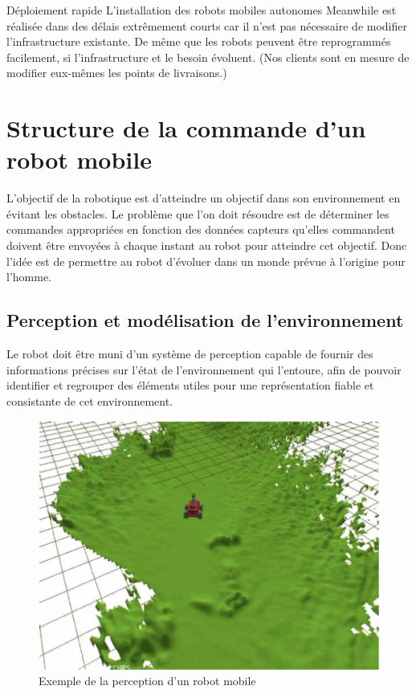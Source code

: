 Déploiement rapide 
L’installation des robots mobiles autonomes Meanwhile est réalisée dans des délais extrêmement courts car il n’est pas nécessaire de modifier l’infrastructure existante. De même que les robots peuvent être reprogrammés facilement, si l’infrastructure et le besoin évoluent. (Nos clients sont en mesure de modifier eux-mêmes les points de livraisons.)

\section{Structure de la commande d’un robot mobile}
L'objectif de la robotique est d'atteindre un objectif dans son environnement en évitant les obstacles. Le problème que l'on doit résoudre est de déterminer les commandes appropriées en fonction des données capteurs qu'elles commandent doivent être envoyées à chaque instant au robot pour atteindre cet objectif. Donc l'idée est de permettre au robot d'évoluer dans un monde prévue à l'origine pour l'homme. 


\subsection{Perception et modélisation de l'environnement}

Le robot doit être muni d’un système de perception capable de fournir des informations précises sur l'état de l’environnement qui l’entoure, afin de pouvoir identifier et regrouper des éléments utiles pour une représentation fiable et consistante de cet environnement.
\begin{figure}[h]
    \centering
    \includegraphics[width=14cm]{assets/perception.png}
    \caption{Exemple de la perception d'un robot mobile }
    \label{perception}
    \end{figure}

